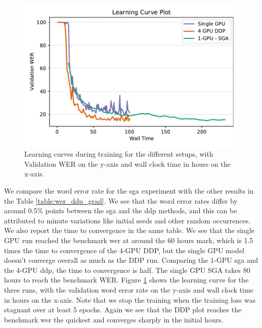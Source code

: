 \begin{figure}[ht]
  \begin{center}
    \includegraphics[width=\textwidth]{images/learning_curve_8000.pdf} 
    \caption{Learning curves during training for the different setups, with Validation WER on the y-axis and wall clock time in hours on the x-axis.}
    \label{fig:learningcurve_ddp}
  \end{center}
\end{figure}

We compare the word error rate for the \acrshort{sga} experiment with the other results in the Table \ref{table:wer_ddp_grad}. We see that the word error rates differ by around 0.5\% points between the \acrshort{sga} and the \acrshort{ddp} methods, and this can be attributed to minute variations like initial seeds and other random occurrences. We also report the time to convergence in the same table. We see that the single GPU run reached the benchmark \acrshort{wer} at around the 60 hours mark, which is 1.5 times the time to convergence of the 4-GPU DDP, but the single GPU model doesn't converge overall as much as the DDP run. Comparing the 1-GPU \acrshort{sga} and the 4-GPU \acrshort{ddp}, the time to convergence is half. The single GPU SGA takes 80 hours to reach the benchmark WER. Figure \ref{fig:learningcurve_ddp} shows the learning curve for the three runs, with the validation word error rate on the y-axis and wall clock time in hours on the x-axis. Note that we stop the training when the training loss was stagnant over at least 5 epochs. Again we see that the DDP plot reaches the benchmark \acrshort{wer} the quickest and converges sharply in the initial hours. 

